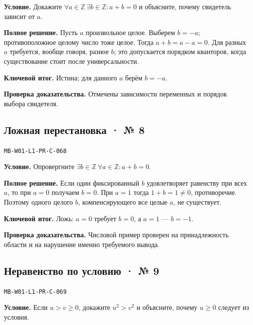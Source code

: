 \documentclass[11pt,a4paper,openany]{book}
\newcommand{\muid}[1]{\texttt{\footnotesize #1}}
\begin{document}
\textbf{Условие.} Докажите $\forall a\in\mathbb Z\ \exists b\in\mathbb Z\colon a+b=0$ и объясните, почему свидетель зависит от $a$.\par

\textbf{Полное решение.} Пусть $a$ произвольное целое. Выберем $b=-a$; противоположное целому число тоже целое. Тогда $a+b=a-a=0$. Для разных $a$ требуется, вообще говоря, разное $b$; это допускается порядком кванторов, когда существование стоит после универсальности.


\begin{learnbox}\textbf{Ключевой итог.} Истина; для данного $a$ берём $b=-a$.\par \textbf{Проверка доказательства.} 
Отмечены зависимости переменных и порядок выбора свидетеля. 
\end{learnbox}

\subsection*{Ложная перестановка · № 8}\hypertarget{solution:MB-W01-L1-PR-C-068}{}

\muid{MB-W01-L1-PR-C-068}\par

\textbf{Условие.} Опровергните $\exists b\in\mathbb Z\ \forall a\in\mathbb Z\colon a+b=0$.\par

\textbf{Полное решение.} Если один фиксированный $b$ удовлетворяет равенству при всех $a$, то при $a=0$ получаем $b=0$. При $a=1$ тогда $1+b=1\ne0$, противоречие. Поэтому одного целого $b$, компенсирующего все целые $a$, не существует.


\begin{learnbox}\textbf{Ключевой итог.} Ложь: $a=0$ требует $b=0$, а $a=1$ — $b=-1$.\par \textbf{Проверка доказательства.} 
Числовой пример проверен на принадлежность области и на нарушение именно требуемого вывода. 
\end{learnbox}

\subsection*{Неравенство по условию · № 9}\hypertarget{solution:MB-W01-L1-PR-C-069}{}

\muid{MB-W01-L1-PR-C-069}\par

\textbf{Условие.} Если $u>v\ge0$, докажите $u^2>v^2$ и объясните, почему $u\ge0$ следует из условия.\par
\end{document}
